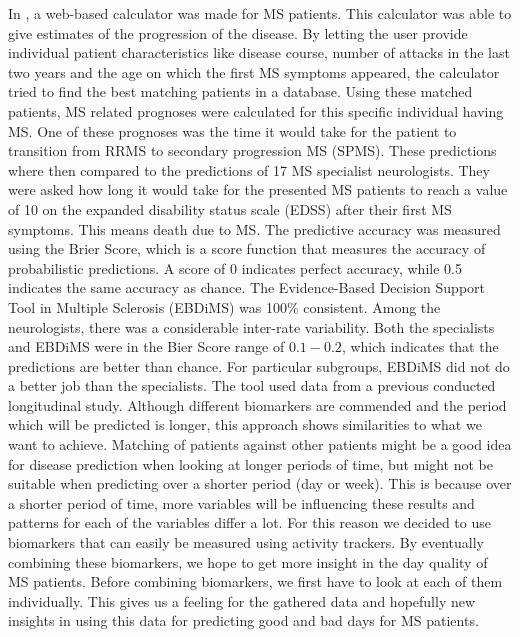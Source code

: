 In \cite{galea2013web}, a web-based calculator was made for MS patients.
This calculator was able to give estimates of the progression of the disease.
By letting the user provide individual patient characteristics like disease course, number of attacks in the last two years and the age on which the first MS symptoms appeared, the calculator tried to find the best matching patients in a database.
Using these matched patients, MS related prognoses were calculated for this specific individual having MS. 
One of these prognoses was the time it would take for the patient to transition from RRMS to secondary progression MS (SPMS).
These predictions where then compared to the predictions of 17 MS specialist neurologists.
They were asked how long it would take for the presented MS patients to reach a value of 10 on the expanded disability status scale (EDSS) after their first MS symptoms.
This means death due to MS.
The predictive accuracy was measured using the Brier Score, which is a score function that measures the accuracy of probabilistic predictions. 
A score of 0 indicates perfect accuracy, while 0.5 indicates the same accuracy as chance.
The Evidence-Based Decision Support Tool in Multiple Sclerosis (EBDiMS) was 100\% consistent.
Among the neurologists, there was a considerable inter-rate variability.
Both the specialists and EBDiMS were in the Bier Score range of $0.1-0.2$, which indicates that the predictions are better than chance.
For particular subgroups, EBDiMS did not do a better job than the specialists.
The tool used data from a previous conducted longitudinal study.
Although different biomarkers are commended and the period which will be predicted is longer, this approach shows similarities to what we want to achieve.
Matching of patients against other patients might be a good idea for disease prediction when looking at longer periods of time, but might not be suitable when predicting over a shorter period (day or week).
This is because over a shorter period of time, more variables will be influencing these results and patterns for each of the variables differ a lot.
For this reason we decided to use biomarkers that can easily be measured using activity trackers. 
By eventually combining these biomarkers, we hope to get more insight in the day quality of MS patients. 
Before combining biomarkers, we first have to look at each of them individually.
This gives us a feeling for the gathered data and hopefully new insights in using this data for predicting good and bad days for MS patients.

